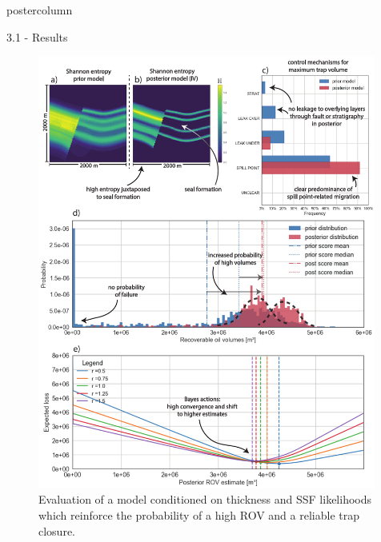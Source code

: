 \documentclass{beamer}
\begin{document}
\begin{frame}
\begin{columns}
\begin{column}{.499\textwidth}
\begin{beamercolorbox}[center]{postercolumn}
\begin{minipage}{.98\textwidth}
{\begin{myblock}{3.1 - Results}				
	\vspace{0.2em}
	\begin{figure}
		\begin{minipage}{0.98\textwidth}
			\begin{minipage}[t]{0.49\textwidth}
				\centering\includegraphics[width=0.99\textwidth]{figures/ML4.pdf}
				\caption{Evaluation of a model conditioned on thickness and SSF likelihoods which reinforce the probability of a high ROV and a reliable trap closure.}

\end{minipage}
\end{minipage}
\end{figure}
\end{myblock}}
\end{minipage}
\end{beamercolorbox}
\end{column}
\end{columns}
\end{frame}
\end{document}
